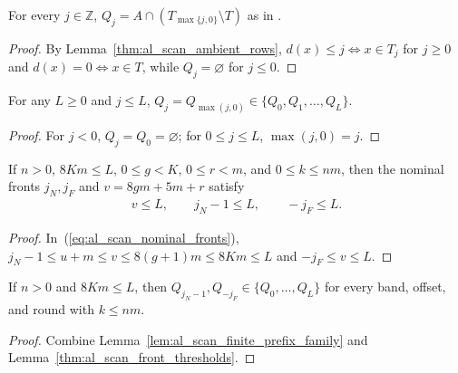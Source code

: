 \begin{lemma}
    \label{thm:al_scan_positive_prefix_collars}
    \leanok
    For every $j\in\mathbb Z$, $Q_j=A\cap(T_{\max\{j,0\}}\setminus T)$ as in
    \cite[Section~9]{OpenAI2026AreaLaw}.
\end{lemma}
\begin{proof}\leanok
    By Lemma~\ref{thm:al_scan_ambient_rows}, $d(x)\le j\iff x\in T_j$ for
    $j\ge0$ and $d(x)=0\iff x\in T$, while $Q_j=\varnothing$ for $j\le0$.
\end{proof}

\begin{lemma}
    \label{lem:al_scan_finite_prefix_family}
    \leanok
    For any $L\ge0$ and $j\le L$, $Q_j=Q_{\max(j,0)}\in\{Q_0,Q_1,\ldots,Q_L\}$.
\end{lemma}
\begin{proof}\leanok
    For $j<0$, $Q_j=Q_0=\varnothing$; for $0\le j\le L$, $\max(j,0)=j$.
\end{proof}

\begin{lemma}
    \label{thm:al_scan_front_thresholds}
    \leanok
    If $n>0$, $8Km\le L$, $0\le g<K$, $0\le r<m$, and $0\le k\le nm$, then the
    nominal fronts $j_N,j_F$ and $v=8gm+5m+r$ satisfy
    \begin{align}
        v\le L,\qquad j_N-1\le L,\qquad -j_F\le L.
        \label{eq:al_scan_front_thresholds}
    \end{align}
\end{lemma}
\begin{proof}\leanok
    In~(\ref{eq:al_scan_nominal_fronts}), $j_N-1\le u+m\le v\le 8(g+1)m\le 8Km\le L$
    and $-j_F\le v\le L$.
\end{proof}

\begin{corollary}
    \label{cor:al_scan_front_prefix_family}
    \leanok
    If $n>0$ and $8Km\le L$, then $Q_{j_N-1},Q_{-j_F}\in\{Q_0,\ldots,Q_L\}$ for
    every band, offset, and round with $k\le nm$.
\end{corollary}
\begin{proof}\leanok
    Combine Lemma~\ref{lem:al_scan_finite_prefix_family} and
    Lemma~\ref{thm:al_scan_front_thresholds}.
\end{proof}


